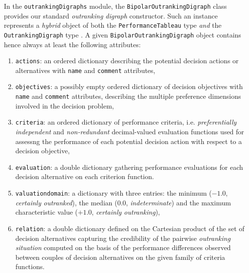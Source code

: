 In the \texttt{outrankingDigraphs} module, the \texttt{BipolarOutrankingDigraph} class provides our standard \emph{outranking digraph} constructor. Such an instance represents a \emph{hybrid} object of both the \texttt{PerformanceTableau} type \emph{and} the \texttt{Outran\-kingDigraph} type \citep{BIS-2021b}. A given \texttt{BipolarOutrankingDigraph} object contains hence always at least the following attributes:
\begin{enumerate}[topsep=3pt,partopsep=0pt]
\item \texttt{actions}: an ordered dictionary describing the potential decision actions or alternatives with \texttt{name} and \texttt{comment} attributes,
\item \texttt{objectives}: a possibly empty ordered dictionary of decision objectives with \texttt{name} and \texttt{comment} attributes, describing the multiple preference dimensions involved in the decision problem, 
\item \texttt{criteria}: an ordered dictionary of performance criteria, i.e. \emph{preferentially independent} and \emph{non-redundant} decimal-valued evaluation functions used for assessng the performance of each potential decision action with respect to a decision objective,
\item \texttt{evaluation}: a double dictionary gathering performance evaluations for each decision alternative on each criterion function. 
\item \texttt{valuationdomain}: a dictionary with three entries: the minimum ($-1.0$, \emph{certainly outranked}), the median ($0.0$, \emph{indeterminate}) and the maximum characteristic value ($+1.0$, \emph{certainly outranking}),
\item \texttt{relation}: a double dictionary defined on the Cartesian product of the set of decision alternatives capturing the credibility of the pairwise \emph{outranking situation} computed on the basis of the performance differences observed between couples of decision alternatives on the given family of criteria functions.   
\end{enumerate}

